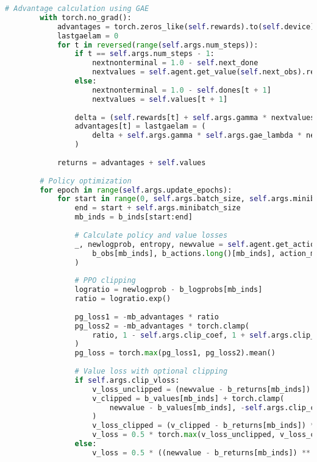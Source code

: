 \documentclass[12pt,a4paper]{article}
\begin{document}
\begin{lstlisting}[language=Python, caption=PPO Training Core Logic]
        # Advantage calculation using GAE
        with torch.no_grad():
            advantages = torch.zeros_like(self.rewards).to(self.device)
            lastgaelam = 0
            for t in reversed(range(self.args.num_steps)):
                if t == self.args.num_steps - 1:
                    nextnonterminal = 1.0 - self.next_done
                    nextvalues = self.agent.get_value(self.next_obs).reshape(1, -1)
                else:
                    nextnonterminal = 1.0 - self.dones[t + 1]
                    nextvalues = self.values[t + 1]
                
                delta = (self.rewards[t] + self.args.gamma * nextvalues * nextnonterminal - self.values[t])
                advantages[t] = lastgaelam = (
                    delta + self.args.gamma * self.args.gae_lambda * nextnonterminal * lastgaelam
                )
            
            returns = advantages + self.values
        
        # Policy optimization
        for epoch in range(self.args.update_epochs):
            for start in range(0, self.args.batch_size, self.args.minibatch_size):
                end = start + self.args.minibatch_size
                mb_inds = b_inds[start:end]
                
                # Calculate policy and value losses
                _, newlogprob, entropy, newvalue = self.agent.get_action_and_value(
                    b_obs[mb_inds], b_actions.long()[mb_inds], action_mask=b_action_masks[mb_inds]
                )
                
                # PPO clipping
                logratio = newlogprob - b_logprobs[mb_inds]
                ratio = logratio.exp()
                
                pg_loss1 = -mb_advantages * ratio
                pg_loss2 = -mb_advantages * torch.clamp(
                    ratio, 1 - self.args.clip_coef, 1 + self.args.clip_coef
                )
                pg_loss = torch.max(pg_loss1, pg_loss2).mean()
                
                # Value loss with optional clipping
                if self.args.clip_vloss:
                    v_loss_unclipped = (newvalue - b_returns[mb_inds]) ** 2
                    v_clipped = b_values[mb_inds] + torch.clamp(
                        newvalue - b_values[mb_inds], -self.args.clip_coef, self.args.clip_coef
                    )
                    v_loss_clipped = (v_clipped - b_returns[mb_inds]) ** 2
                    v_loss = 0.5 * torch.max(v_loss_unclipped, v_loss_clipped).mean()
                else:
                    v_loss = 0.5 * ((newvalue - b_returns[mb_inds]) ** 2).mean()
                

\end{lstlisting}
\end{document}
